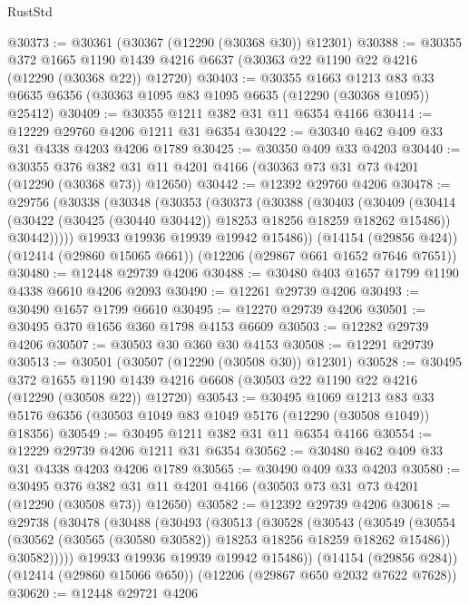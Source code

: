 \begin{lexlean}{RustStd}
\begin{coremodule}
{\begin{coremodule}
{{{{{{{{{{{{{{{{{{{{{{{{{{{{{{{{{{{{{{{{{{{{{{{{{{@30373 := @30361 (@30367 (@12290 (@30368 @30)) @12301)
@30388 := @30355
    @372
    @1665
    @1190
    @1439
    @4216
    @6637
    (@30363 @22 @1190 @22 @4216 (@12290 (@30368 @22)) @12720)
@30403 := @30355
    @1663
    @1213
    @83
    @33
    @6635
    @6356
    (@30363 @1095 @83 @1095 @6635 (@12290 (@30368 @1095)) @25412)
@30409 := @30355 @1211 @382 @31 @11 @6354 @4166
@30414 := @12229 @29760 @4206 @1211 @31 @6354
@30422 := @30340 @462 @409 @33 @31 @4338 @4203 @4206 @1789
@30425 := @30350 @409 @33 @4203
@30440 := @30355
    @376
    @382
    @31
    @11
    @4201
    @4166
    (@30363 @73 @31 @73 @4201 (@12290 (@30368 @73)) @12650)
@30442 := @12392 @29760 @4206
@30478 := @29756
    (@30338
      (@30348
        (@30353
          (@30373
            (@30388
              (@30403
                (@30409
                  (@30414 (@30422 (@30425 (@30440 @30442)) @18253 @18256 @18259 @18262 @15486))
                  @30442)))))
        @19933
        @19936
        @19939
        @19942
        @15486))
    (@14154 (@29856 @424))
    (@12414 (@29860 @15065 @661))
    (@12206 (@29867 @661 @1652 @7646 @7651))
@30480 := @12448 @29739 @4206
@30488 := @30480 @403 @1657 @1799 @1190 @4338 @6610 @4206 @2093
@30490 := @12261 @29739 @4206
@30493 := @30490 @1657 @1799 @6610
@30495 := @12270 @29739 @4206
@30501 := @30495 @370 @1656 @360 @1798 @4153 @6609
@30503 := @12282 @29739 @4206
@30507 := @30503 @30 @360 @30 @4153
@30508 := @12291 @29739
@30513 := @30501 (@30507 (@12290 (@30508 @30)) @12301)
@30528 := @30495
    @372
    @1655
    @1190
    @1439
    @4216
    @6608
    (@30503 @22 @1190 @22 @4216 (@12290 (@30508 @22)) @12720)
@30543 := @30495
    @1069
    @1213
    @83
    @33
    @5176
    @6356
    (@30503 @1049 @83 @1049 @5176 (@12290 (@30508 @1049)) @18356)
@30549 := @30495 @1211 @382 @31 @11 @6354 @4166
@30554 := @12229 @29739 @4206 @1211 @31 @6354
@30562 := @30480 @462 @409 @33 @31 @4338 @4203 @4206 @1789
@30565 := @30490 @409 @33 @4203
@30580 := @30495
    @376
    @382
    @31
    @11
    @4201
    @4166
    (@30503 @73 @31 @73 @4201 (@12290 (@30508 @73)) @12650)
@30582 := @12392 @29739 @4206
@30618 := @29738
    (@30478
      (@30488
        (@30493
          (@30513
            (@30528
              (@30543
                (@30549
                  (@30554 (@30562 (@30565 (@30580 @30582)) @18253 @18256 @18259 @18262 @15486))
                  @30582)))))
        @19933
        @19936
        @19939
        @19942
        @15486))
    (@14154 (@29856 @284))
    (@12414 (@29860 @15066 @650))
    (@12206 (@29867 @650 @2032 @7622 @7628))
@30620 := @12448 @29721 @4206
}}}}}}}}}}}}}}}}}}}}}}}}}}}}}}}}}}}}}}}}}}}}}}}}}}
\end{coremodule}}
\end{coremodule}
\end{lexlean}
